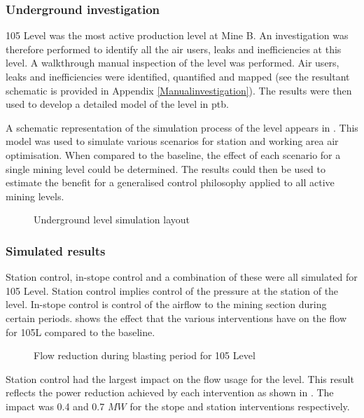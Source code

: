 	\subsubsection{Underground investigation}
	105 Level was the most active production level at Mine B. An investigation was therefore performed to identify all the air users, leaks and inefficiencies at this level. A walkthrough manual inspection of the level was performed. Air users, leaks and inefficiencies were identified, quantified and mapped (see the resultant schematic is provided in Appendix \ref{Manualinvestigation}). The results were then used to develop a detailed model of the level in \gls{ptb}. 
	\par 
	A schematic representation of the simulation process of the level appears in . This model was used to simulate various scenarios for station and working area air optimisation. When compared to the baseline, the effect of each scenario for a single mining level could be determined. The results could then be used to estimate the benefit for a generalised control philosophy applied to all active mining levels.
	\begin{figure}[h!]
		\centering
		\caption{Underground level simulation layout}
		\label{fig: KUS Simulation level layout}
	\end{figure}	
	\clearpage
	\subsubsection{Simulated results}
	Station control, in-stope control and a combination of these were all simulated for 105 Level. Station control implies control of the pressure at the station of the level. In-stope control is control of the airflow to the mining section during certain periods.  shows the effect that the various interventions have on the flow for 105L compared to the baseline.

	\begin{figure}[h!]
		\centering
		
		\caption{Flow reduction during blasting period for 105 Level}
		\label{fig: 105 Flow savings}
	\end{figure}
Station control had the largest impact on the flow usage for the level. This result reflects the power reduction achieved by each intervention as shown in . The impact was 0.4 and 0.7 $MW$ for the stope and station interventions respectively.
	
